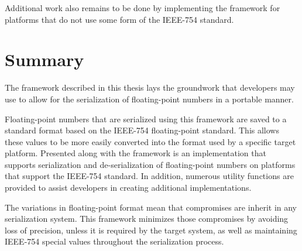 Additional work also remains to be done by implementing the framework for platforms that do not use some form of the IEEE-754 standard.

\section{Summary}
The framework described in this thesis lays the groundwork that developers may use to allow for the serialization of floating-point numbers in a portable manner.

Floating-point numbers that are serialized using this framework are saved to a standard format based on the IEEE-754 floating-point standard. This allows these values to be more easily converted into the format used by a specific target platform. Presented along with the framework is an implementation that supports serialization and de-serialization of floating-point numbers on platforms that support the IEEE-754 standard. In addition, numerous utility functions are provided to assist developers in creating additional implementations.

The variations in floating-point format mean that compromises are inherit in any serialization system. This framework minimizes those compromises by avoiding loss of precision, unless it is required by the target system, as well as maintaining IEEE-754 special values throughout the serialization process.